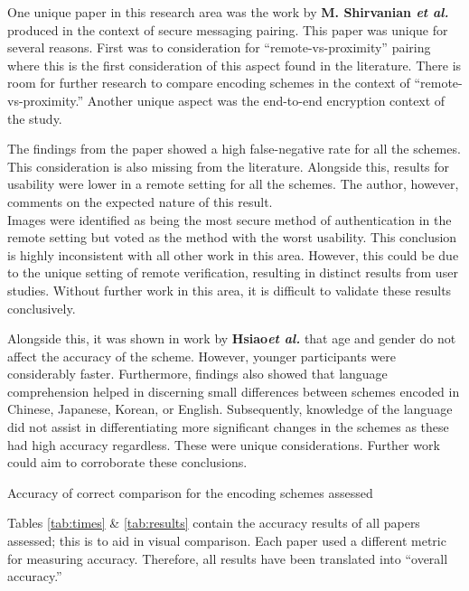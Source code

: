 One unique paper in this research area was the work by \textbf{M. Shirvanian \textit{et al.}}\cite{shirvanian2017pitfalls} produced in the context of secure messaging pairing. This paper was unique for several reasons. First was to consideration for ``remote-vs-proximity'' pairing where this is the first consideration of this aspect found in the literature. There is room for further research to compare encoding schemes in the context of ``remote-vs-proximity.'' Another unique aspect was the end-to-end encryption context of the study.

The findings from the paper showed a high false-negative rate for all the schemes. This consideration is also missing from the literature. Alongside this, results for usability were lower in a remote setting for all the schemes. The author, however, comments on the expected nature of this result.\\
Images were identified as being the most secure method of authentication in the remote setting but voted as the method with the worst usability. This conclusion is highly inconsistent with all other work in this area. However, this could be due to the unique setting of remote verification, resulting in distinct results from user studies. Without further work in this area, it is difficult to validate these results conclusively.

Alongside this, it was shown in work by \textbf{Hsiao\textit{et al.}}\cite{hsiao2009study} that age and gender do not affect the accuracy of the scheme. However, younger participants were considerably faster. Furthermore, findings also showed that language comprehension helped in discerning small differences between schemes encoded in Chinese, Japanese, Korean, or English. Subsequently, knowledge of the language did not assist in differentiating more significant changes in the schemes as these had high accuracy regardless. These were unique considerations. Further work could aim to corroborate these conclusions.

\begin{table}[h!]
    \makebox[\textwidth][c]{
        
    }%
    \caption{Accuracy of correct comparison for the encoding schemes assessed}
    \label{tab:results}
\end{table}

Tables \ref{tab:times} \& \ref{tab:results} contain the accuracy results of all papers assessed; this is to aid in visual comparison. Each paper used a different metric for measuring accuracy. Therefore, all results have been translated into ``overall accuracy.''

